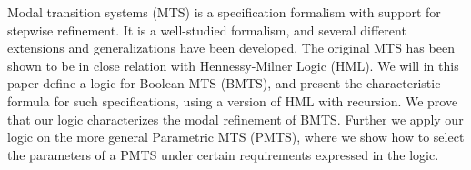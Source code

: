 Modal transition systems (MTS) is a specification formalism with support for stepwise refinement. It is a well-studied formalism, and  several different extensions and generalizations have been developed. The original MTS has been shown to be in close relation with Hennessy-Milner Logic (HML). We will in this paper define a logic for Boolean MTS (BMTS), and present the characteristic formula for such specifications, using a version of HML with recursion. We prove that our logic characterizes the modal refinement of BMTS. Further we apply our logic on the more general Parametric MTS (PMTS), where we show how to select the parameters of a PMTS under certain requirements expressed in the logic.